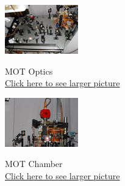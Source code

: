 \documentclass{../lab}
\begin{document}
\noindent
\begin{figure}[H]
\captionsetup{justification=centering}
  \href{http://experimentationlab.berkeley.edu/sites/default/files/images/MOT_318_1.jpg}{\includegraphics[width=\linewidth,keepaspectratio]{images/120px-MOT_318_t1.jpg}}
  \caption{MOT Optics\\ \href{http://experimentationlab.berkeley.edu/sites/default/files/images/MOT_318_1.jpg}{Click here to see larger picture}}
  \label{fig:MOT_318_1.jpg}
\endminipage\hfill
{}
  \href{http://experimentationlab.berkeley.edu/sites/default/files/images/MOTChamber_284_1.jpg}{\includegraphics[width=\linewidth,keepaspectratio]{images/120px-MOTChamber_284_t1.jpg}}
  \caption{MOT Chamber\\
  \href{http://experimentationlab.berkeley.edu/sites/default/files/images/MOTChamber_284_1.jpg}{Click here to see larger picture}}

\end{figure}
\end{document}
